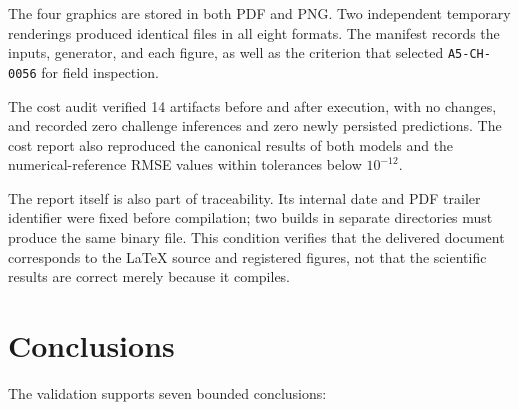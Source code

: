 \documentclass[11pt,a4paper]{article}
\newcommand{\code}[1]{\texttt{#1}}
\begin{document}
The four graphics are stored in both PDF and PNG. Two independent temporary
renderings produced identical files in all eight formats. The manifest records
the inputs, generator, and each figure, as well as the criterion that selected
\code{A5-CH-0056} for field inspection.

The cost audit verified 14 artifacts before and after execution, with no
changes, and recorded zero challenge inferences and zero newly persisted
predictions. The cost report also reproduced the canonical results of both
models and the numerical-reference RMSE values within tolerances below
$10^{-12}$.

The report itself is also part of traceability. Its internal date and PDF
trailer identifier were fixed before compilation; two builds in separate
directories must produce the same binary file. This condition verifies that
the delivered document corresponds to the LaTeX source and registered figures,
not that the scientific results are correct merely because it compiles.

\section{Conclusions}

The validation supports seven bounded conclusions:
\end{document}
